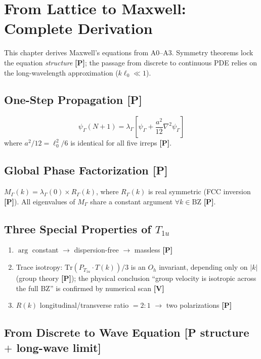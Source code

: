 \documentclass[11pt,a4paper]{article}
\newcommand{\gradeP}{\textbf{[P]}}
\newcommand{\gradeV}{\textbf{[V]}}
\begin{document}
\section{From Lattice to Maxwell: Complete Derivation}\label{sec:maxwell}

This chapter derives Maxwell's equations from A0--A3. Symmetry theorems lock the equation \emph{structure} \gradeP; the passage from discrete to continuous PDE relies on the long-wavelength approximation ($k\ell_0 \ll 1$).

\subsection{One-Step Propagation \gradeP}
$$\psi_\Gamma(N{+}1) = \lambda_\Gamma\!\left[\psi_\Gamma + \frac{a^2}{12}\nabla^2\psi_\Gamma\right]$$
where $a^2/12 = \ell_0^2/6$ is identical for all five irreps \gradeP.

\subsection{Global Phase Factorization \gradeP}
$M_\Gamma(k) = \lambda_\Gamma(0)\times R_\Gamma(k)$, where $R_\Gamma(k)$ is real symmetric (FCC inversion \gradeP). All eigenvalues of $M_\Gamma$ share a constant argument $\forall k\in\mathrm{BZ}$ \gradeP.

\subsection{Three Special Properties of $T_{1u}$}
\begin{enumerate}[nosep]
\item $\arg$ constant $\to$ dispersion-free $\to$ massless \gradeP
\item Trace isotropy: $\mathrm{Tr}(P_{T_{1u}}\cdot T(k))/3$ is an $O_h$ invariant, depending only on $|k|$ (group theory \gradeP); the physical conclusion ``group velocity is isotropic across the full BZ'' is confirmed by numerical scan \gradeV
\item $R(k)$ longitudinal/transverse ratio $= 2{:}1$ $\to$ two polarizations \gradeP
\end{enumerate}

\subsection{From Discrete to Wave Equation [P structure $+$ long-wave limit]}
\end{document}
